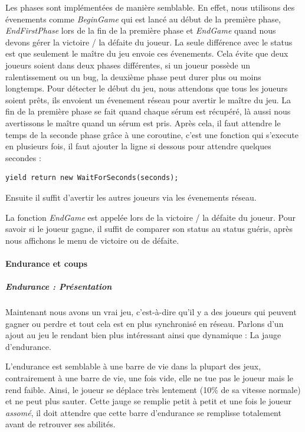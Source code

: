 \documentclass{article}
\begin{document}
Les phases sont implémentées de manière semblable. En effet, nous utilisons des évenements comme \emph{BeginGame} qui est lancé au début de la première phase, \emph{EndFirstPhase} lors de la fin de la première phase et \emph{EndGame} quand nous devons gérer la victoire / la défaite du joueur. La seule différence avec le status est que seulement le maître du jeu envoie ces évenements. Cela évite que deux joueurs soient dans deux phases différentes, si un joueur possède un ralentissement ou un bug, la deuxième phase peut durer plus ou moins longtemps. Pour détecter le début du jeu, nous attendons que tous les joueurs soient prêts, ils envoient un évenement réseau pour avertir le maître du jeu. La fin de la première phase se fait quand chaque sérum est récupéré, là aussi nous avertissons le maître quand un sérum est pris. Après cela, il faut attendre le temps de la seconde phase grâce à une coroutine, c'est une fonction qui s'execute en plusieurs fois, il faut ajouter la ligne si dessous pour attendre quelques secondes :

\begin{lstlisting}
yield return new WaitForSeconds(seconds);
\end{lstlisting}

Ensuite il suffit d'avertir les autres joueurs via les évenements réseau.

La fonction \emph{EndGame} est appelée lors de la victoire / la défaite du joueur. Pour savoir si le joueur gagne, il suffit de comparer son status au status guéris, après nous affichons le menu de victoire ou de défaite.

\newpage
\paragraph{Endurance et coups}

\subparagraph{Endurance : Présentation}

Maintenant nous avons un vrai jeu, c'est-à-dire qu'il y a des joueurs qui peuvent gagner ou perdre et tout cela est en plus synchronisé en réseau. Parlons d'un ajout au jeu le rendant bien plus intéressant ainsi que dynamique : La jauge d'endurance.

L'endurance est semblable à une barre de vie dans la plupart des jeux, contrairement à une barre de vie, une fois vide, elle ne tue pas le joueur mais le rend faible. Ainsi, le joueur se déplace très lentement (10\% de sa vitesse normale) et ne peut plus sauter. Cette jauge se remplie petit à petit et une fois le joueur \emph{assomé}, il doit attendre que cette barre d'endurance se remplisse totalement avant de retrouver ses abilités.
\end{document}
